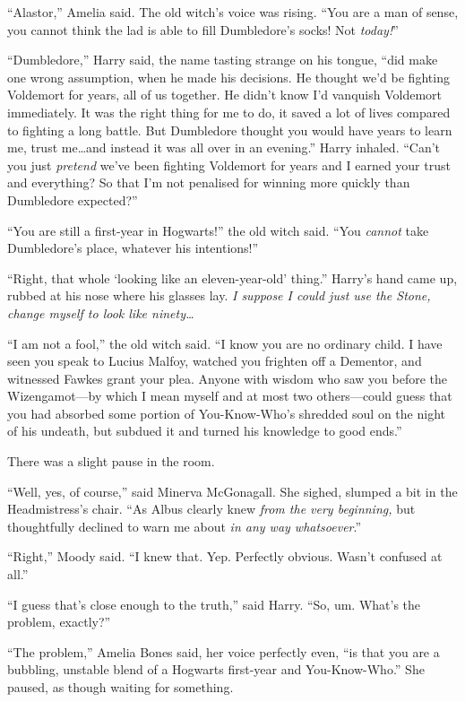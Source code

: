 “Alastor,” Amelia said. The old witch’s voice was rising. “You are a man of sense, you cannot think the lad is able to fill Dumbledore’s socks! Not \emph{today!}”

“Dumbledore,” Harry said, the name tasting strange on his tongue, “did make one wrong assumption, when he made his decisions. He thought we’d be fighting Voldemort for years, all of us together. He didn’t know I’d vanquish Voldemort immediately. It was the right thing for me to do, it saved a lot of lives compared to fighting a long battle. But Dumbledore thought you would have years to learn me, trust me…and instead it was all over in an evening.” Harry inhaled. “Can’t you just \emph{pretend} we’ve been fighting Voldemort for years and I earned your trust and everything? So that I’m not penalised for winning more quickly than Dumbledore expected?”

“You are still a first-year in Hogwarts!” the old witch said. “You \emph{cannot} take Dumbledore’s place, whatever his intentions!”

“Right, that whole ‘looking like an eleven-year-old’ thing.” Harry’s hand came up, rubbed at his nose where his glasses lay. \emph{I suppose I could just use the Stone, change myself to look like ninety…}

“I am not a fool,” the old witch said. “I know you are no ordinary child. I have seen you speak to Lucius Malfoy, watched you frighten off a Dementor, and witnessed Fawkes grant your plea. Anyone with wisdom who saw you before the Wizengamot—by which I mean myself and at most two others—could guess that you had absorbed some portion of You-Know-Who’s shredded soul on the night of his undeath, but subdued it and turned his knowledge to good ends.”

There was a slight pause in the room.

“Well, yes, of course,” said Minerva McGonagall. She sighed, slumped a bit in the Headmistress’s chair. “As Albus clearly knew \emph{from the very beginning,} but thoughtfully declined to warn me about \emph{in any way whatsoever}.”

“Right,” Moody said. “I knew that. Yep. Perfectly obvious. Wasn’t confused at all.”

“I guess that’s close enough to the truth,” said Harry. “So, um. What’s the problem, exactly?”

“The problem,” Amelia Bones said, her voice perfectly even, “is that you are a bubbling, unstable blend of a Hogwarts first-year and You-Know-Who.” She paused, as though waiting for something.

